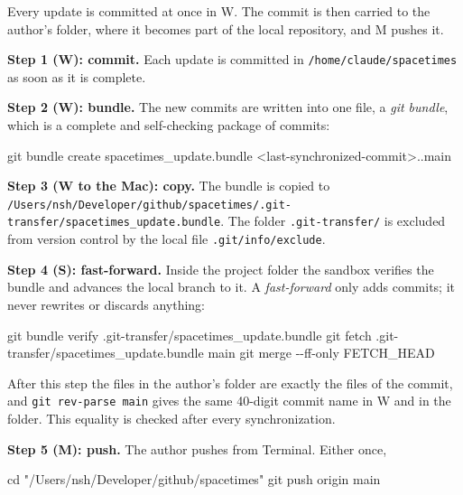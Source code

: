 \documentclass[
  10pt,
]{article}
\newenvironment{Shaded}{}{}
\newcommand{\AttributeTok}[1]{\textcolor[rgb]{0.49,0.56,0.16}{#1}}
\newcommand{\BuiltInTok}[1]{\textcolor[rgb]{0.00,0.50,0.00}{#1}}
\newcommand{\FunctionTok}[1]{\textcolor[rgb]{0.02,0.16,0.49}{#1}}
\newcommand{\NormalTok}[1]{#1}
\newcommand{\OperatorTok}[1]{\textcolor[rgb]{0.40,0.40,0.40}{#1}}
\newcommand{\StringTok}[1]{\textcolor[rgb]{0.25,0.44,0.63}{#1}}
\begin{document}
Every update is committed at once in W. The commit is then carried to
the author's folder, where it becomes part of the local repository, and
M pushes it.

\textbf{Step 1 (W): commit.} Each update is committed in
\texttt{/home/claude/spacetimes} as soon as it is complete.

\textbf{Step 2 (W): bundle.} The new commits are written into one file,
a \emph{git bundle}, which is a complete and self-checking package of
commits:

\begin{Shaded}
\begin{Highlighting}[]
\FunctionTok{git}\NormalTok{ bundle create spacetimes\_update.bundle }\OperatorTok{\textless{}}\NormalTok{last{-}synchronized{-}commit}\OperatorTok{\textgreater{}}\NormalTok{..main}
\end{Highlighting}
\end{Shaded}

\textbf{Step 3 (W to the Mac): copy.} The bundle is copied to
\texttt{/Users/nsh/Developer/github/spacetimes/.git-transfer/spacetimes\_update.bundle}.
The folder \texttt{.git-transfer/} is excluded from version control by
the local file \texttt{.git/info/exclude}.

\textbf{Step 4 (S): fast-forward.} Inside the project folder the sandbox
verifies the bundle and advances the local branch to it. A
\emph{fast-forward} only adds commits; it never rewrites or discards
anything:

\begin{Shaded}
\begin{Highlighting}[]
\FunctionTok{git}\NormalTok{ bundle verify .git{-}transfer/spacetimes\_update.bundle}
\FunctionTok{git}\NormalTok{ fetch .git{-}transfer/spacetimes\_update.bundle main}
\FunctionTok{git}\NormalTok{ merge }\AttributeTok{{-}{-}ff{-}only}\NormalTok{ FETCH\_HEAD}
\end{Highlighting}
\end{Shaded}

After this step the files in the author's folder are exactly the files
of the commit, and \texttt{git\ rev-parse\ main} gives the same 40-digit
commit name in W and in the folder. This equality is checked after every
synchronization.

\textbf{Step 5 (M): push.} The author pushes from Terminal. Either once,

\begin{Shaded}
\begin{Highlighting}[]
\BuiltInTok{cd} \StringTok{"/Users/nsh/Developer/github/spacetimes"}
\FunctionTok{git}\NormalTok{ push origin main}
\end{Highlighting}
\end{Shaded}
\end{document}
